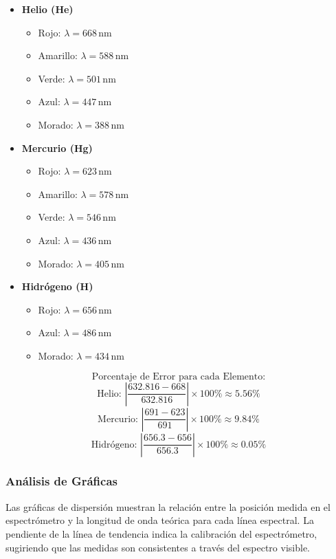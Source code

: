\begin{itemize}
    \item \textbf{Helio (He)}
    \begin{itemize}
        \item Rojo: \( \lambda = 668 \, \text{nm} \)
        \item Amarillo: \( \lambda = 588 \, \text{nm} \)
        \item Verde: \( \lambda = 501 \, \text{nm} \)
        \item Azul: \( \lambda = 447 \, \text{nm} \)
        \item Morado: \( \lambda = 388 \, \text{nm} \)
    \end{itemize}
    \item \textbf{Mercurio (Hg)}
    \begin{itemize}
        \item Rojo: \( \lambda = 623 \, \text{nm} \)
        \item Amarillo: \( \lambda = 578 \, \text{nm} \)
        \item Verde: \( \lambda = 546 \, \text{nm} \)
        \item Azul: \( \lambda = 436 \, \text{nm} \)
        \item Morado: \( \lambda = 405 \, \text{nm} \)
    \end{itemize}
    \item \textbf{Hidrógeno (H)}
    \begin{itemize}
        \item Rojo: \( \lambda = 656 \, \text{nm} \)
        \item Azul: \( \lambda = 486 \, \text{nm} \)
        \item Morado: \( \lambda = 434 \, \text{nm} \)
    \end{itemize}
\end{itemize}


\[
\text{Porcentaje de Error para cada Elemento:}
\]
\[
\text{Helio: } \left|\frac{632.816 - 668}{632.816}\right| \times 100\% \approx 5.56\%
\]
\[
\text{Mercurio: } \left|\frac{691 - 623}{691}\right| \times 100\% \approx 9.84\%
\]
\[
\text{Hidrógeno: } \left|\frac{656.3 - 656}{656.3}\right| \times 100\% \approx 0.05\%
\]

\subsubsection{Análisis de Gráficas}
Las gráficas de dispersión muestran la relación entre la posición medida en el espectrómetro y la longitud de onda teórica para cada línea espectral. La pendiente de la línea de tendencia indica la calibración del espectrómetro, sugiriendo que las medidas son consistentes a través del espectro visible.

